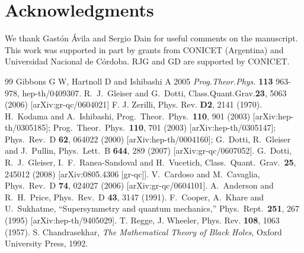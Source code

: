 \documentclass[aps,floats,showpacs,amssymb,tightenlines]{revtex4}
\begin{document}
\section*{Acknowledgments}

We thank Gast\'on \'Avila and Sergio Dain for useful comments on the manuscript.
This work was supported in part by grants from CONICET (Argentina)
and Universidad Nacional de C\'ordoba.  RJG and GD are supported by
CONICET.




\begin{thebibliography}{99}
 Gibbons G W, Hartnoll D and  Ishibashi A 2005 {\em Prog.Theor.Phys.}
{\bf 113} 963-978, hep-th/0409307.
R.~J.~Gleiser and G.~Dotti,
  Class.Quant.Grav.{\bf 23}, 5063 (2006) [arXiv:gr-qc/0604021]
 F. J.
Zerilli, Phys. Rev. {\bf D2}, 2141 (1970).
  H.~Kodama and A.~Ishibashi,
  Prog.\ Theor.\ Phys.\  {\bf 110}, 901 (2003)
  [arXiv:hep-th/0305185];
  Prog.\ Theor.\ Phys.\  {\bf 110}, 701 (2003)
  [arXiv:hep-th/0305147];
  Phys.\ Rev.\  D {\bf 62}, 064022 (2000)
  [arXiv:hep-th/0004160];
  G.~Dotti, R.~Gleiser and J.~Pullin,
  Phys.\ Lett.\  B {\bf 644}, 289 (2007)
  [arXiv:gr-qc/0607052].
  G.~Dotti, R.~J.~Gleiser, I.~F.~Ranea-Sandoval and H.~Vucetich,
  Class.\ Quant.\ Grav.\  {\bf 25}, 245012 (2008)
  [arXiv:0805.4306 [gr-qc]].
  V.~Cardoso and M.~Cavaglia,
  Phys.\ Rev.\  D {\bf 74}, 024027 (2006)
  [arXiv:gr-qc/0604101].
  A.~Anderson and R.~H.~Price,
  Phys.\ Rev.\  D {\bf 43}, 3147 (1991).
  F.~Cooper, A.~Khare and U.~Sukhatme,
  ``Supersymmetry and quantum mechanics,''
  Phys.\ Rept.\  {\bf 251}, 267 (1995)
  [arXiv:hep-th/9405029].
T. Regge, J. Wheeler, Phys. Rev. {\bf 108}, 1063 (1957).
 S. Chandrasekhar, {\em The Mathematical Theory of Black Holes}, Oxford University Press, 1992.

\end{thebibliography}
\end{document}
